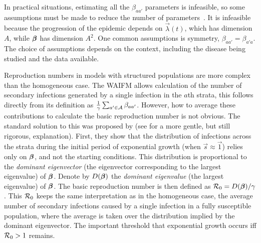 \documentclass[thesis.tex]{subfiles}
\begin{document}
In practical situations, estimating all the $\beta_{aa'}$ parameters is infeasible, so some assumptions must be made to reduce the number of parameters~\autocite[176]{andersonInfectious}.
It is infeasible because the progression of the epidemic depends on $\vec{\lambda}(t)$, which has dimension $A$, while $\bm{\beta}$ has dimension $A^2$.
One common assumptions is symmetry, \ie $\beta_{aa'} = \beta_{a'a}$.
The choice of assumptions depends on the context, including the disease being studied and the data available.

Reproduction numbers in models with structured populations are more complex than the homogeneous case.
The WAIFM allows calculation of the number of secondary infections generated by a single infection in the $a$th strata,  this follows directly from its definition as $\frac{1}{\gamma} \sum_{a' \in \mathcal{A}} \beta_{aa'}$. 
However, how to average these contributions to calculate the basic reproduction number is not obvious.
The standard solution to this was proposed by \textcite{diekmannDefinition} (see \textcite[chapter 7]{diekmannMathematical} for a more gentle, but still rigorous, explanation).
First, they show that the distribution of infections across the strata during the initial period of exponential growth (when $\vec{s} \approx \vec{1}$) relies only on $\bm{\beta}$, and not the starting conditions.
This distribution is proportional to the \emph{dominant eigenvector} (the eigenvector corresponding to the largest eigenvalue) of $\bm{\beta}$.
Denote by $D(\bm{\beta})$ the \emph{dominant eigenvalue} (the largest eigenvalue) of $\bm{\beta}$.
The basic reproduction number is then defined as $\mathcal{R}_{0} = D(\bm{\beta}) / \gamma$.
This $\mathcal{R}_{0}$ keeps the same interpretation as in the homogeneous case, \ie the average number of secondary infections caused by a single infection in a fully susceptible population, where the average is taken over the distribution implied by the dominant eigenvector.
The important threshold that exponential growth occurs iff $\mathcal{R}_{0} > 1$ remains.
\end{document}
